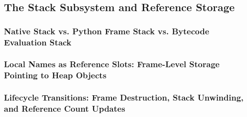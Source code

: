\subsection{The Stack Subsystem and Reference Storage}
\subsubsection{Native Stack vs. Python Frame Stack vs. Bytecode Evaluation Stack}
\subsubsection{Local Names as Reference Slots: Frame-Level Storage Pointing to Heap Objects}
\subsubsection{Lifecycle Transitions: Frame Destruction, Stack Unwinding, and Reference Count Updates}

